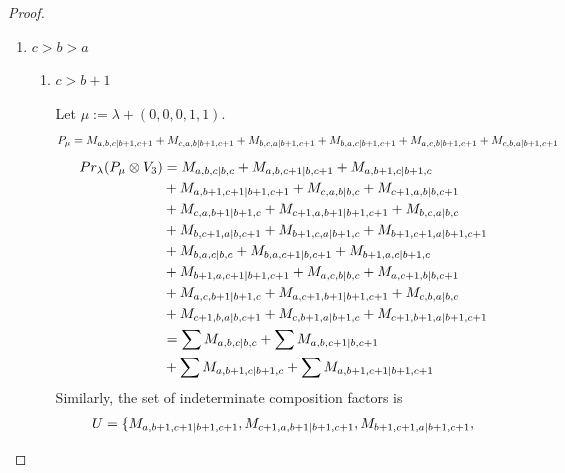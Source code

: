 \begin{proof}
\begin{enumerate}
  \item $c>b>a$
    \begin{enumerate}
      \item $c>b+1$ \par
        Let $\mu:=\lambda + (0,0,0,1,1) $.
        \begin{equation}\notag
          \begin{aligned}
            P_\mu = M_{a,b,c|b+1,c+1}
+ M_{c,a,b|b+1,c+1}
+ M_{b,c,a|b+1,c+1}
+ M_{b,a,c|b+1,c+1}
+ M_{a,c,b|b+1,c+1}
+ M_{c,b,a|b+1,c+1}
          \end{aligned}
        \end{equation}
        \begin{equation}\notag
          \begin{aligned}
            Pr_{\lambda}(P_\mu \otimes V_{3}) &=
M_{a,b,c|b,c}
+ M_{a,b,c+1|b,c+1}
+ M_{a,b+1,c|b+1,c}\\
                                            &
+ M_{a,b+1,c+1|b+1,c+1}
+ M_{c,a,b|b,c}
+ M_{c+1,a,b|b,c+1}\\
                                            &
+ M_{c,a,b+1|b+1,c}
+ M_{c+1,a,b+1|b+1,c+1}
+ M_{b,c,a|b,c}\\
                                            &
+ M_{b,c+1,a|b,c+1}
+ M_{b+1,c,a|b+1,c}
+ M_{b+1,c+1,a|b+1,c+1}\\
                                            &
+ M_{b,a,c|b,c}
+ M_{b,a,c+1|b,c+1}
+ M_{b+1,a,c|b+1,c}\\
                                            &
+ M_{b+1,a,c+1|b+1,c+1}
+ M_{a,c,b|b,c}
+ M_{a,c+1,b|b,c+1}\\
                                            &
+ M_{a,c,b+1|b+1,c}
+ M_{a,c+1,b+1|b+1,c+1}
+ M_{c,b,a|b,c}\\
                                            &
+ M_{c+1,b,a|b,c+1}
+ M_{c,b+1,a|b+1,c}
+ M_{c+1,b+1,a|b+1,c+1} \\
                                               &=
\sum M_{a,b,c|b,c}
+ \sum M_{a,b,c+1|b,c+1}\\
                                            &
+ \sum M_{a,b+1,c|b+1,c}
+ \sum M_{a,b+1,c+1|b+1,c+1}
          \end{aligned}
        \end{equation}
      Similarly, the set of indeterminate composition factors is 
\begin{equation}\notag
  \begin{aligned}
    U = \{
M_{a,b+1,c+1|b+1,c+1},
M_{c+1,a,b+1|b+1,c+1},
M_{b+1,c+1,a|b+1,c+1},

\end{aligned}
\end{equation}
\end{enumerate}
\end{enumerate}
\end{proof}
